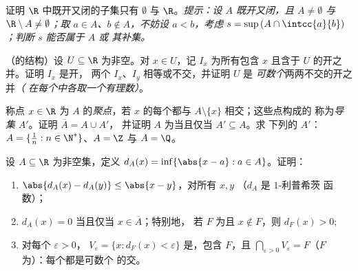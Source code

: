 \begin{exercise}[$\star\star\star$]\label{exo:b1:topology:9}
证明 $\R$ 中既开又闭的子集只有
$\emptyset$ 与 $\R$。\emph{提示：设 $A$ 既开又闭，且
$A \neq \emptyset$ 与 $\R \setminus A \neq \emptyset$；取 $a \in
A$、$b \notin A$，不妨设 $a < b$，考虑 $s = \sup\,(A \cap
\intcc{a}{b})$；判断 $s$ 能否属于 $A$ 或
其补集。}
\end{exercise}

\begin{exercise}[$\star\star\star$]\label{exo:b1:topology:10}
（的结构）设 $U \subseteq \R$ 为非空。对
$x \in U$，记 $I_x$ 为所有包含
$x$ 且含于 $U$ 的开之并。证明 $I_x$ 是开，
两个 $I_x$、$I_y$ 相等或不交，并证明 $U$ 是
\emph{可数个}两两不交的开之并\emph{（
在每个中各取一个有理数）}。
\end{exercise}

\begin{exercise}[$\star\star$]\label{exo:b1:topology:11}
称点 $x \in \R$ 为 $A$ 的\emph{聚点}，若
$x$ 的每个都与 $A \setminus \{x\}$ 相交；这些点构成的
称为\emph{导集} $A'$。证明 $\overline A = A \cup A'$，
并证明 $A$ 为当且仅当 $A' \subseteq A$。求
下列的 $A'$：$A = \{\frac 1n : n \in \N^*\}$、$A = \Z$ 与
$A = \Q$。
\end{exercise}

\begin{exercise}[$\star\star\star$]\label{exo:b1:topology:12}
设 $A \subseteq \R$ 为非空集，定义 $d_A(x) = \inf\{\abs{x - a}
: a \in A\}$。证明：
\begin{enumerate}
  \item $\abs{d_A(x) - d_A(y)} \leq \abs{x - y}$，对所有 $x, y$
        （$d_A$ 是 $1$-利普希茨 函数）；
  \item $d_A(x) = 0$ 当且仅当 $x \in \overline A$；特别地，
        若 $F$ 为且 $x \notin F$，则
        $d_F(x) > 0$;
  \item 对每个 $\varepsilon > 0$， $V_\varepsilon =
        \{x : d_F(x) < \varepsilon\}$ 是，包含 $F$，且
        $\bigcap_{\varepsilon > 0} V_\varepsilon = F$（$F$
        为）：每个都是可数个
        的交。
\end{enumerate}
\end{exercise}

